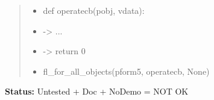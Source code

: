 \begin{boxedminipage}{\funcwidth}
\begin{quote}
\begin{itemize}
  \item
    \setlength{\parskip}{0.6ex}
def operatecb(pobj, vdata):



  \item {\textbar}-{\textgreater}{\textbar} ...



  \item {\textbar}-{\textgreater}{\textbar} return 0



  \item fl\_for\_all\_objects(pform5, operatecb, None)



\end{itemize}

\end{quote}

\textbf{Status:} Untested + Doc + NoDemo = NOT OK



    \end{boxedminipage}

    \label{xformslib:flbasic:fl_set_object_dblclick}

    \vspace{0.5ex}

